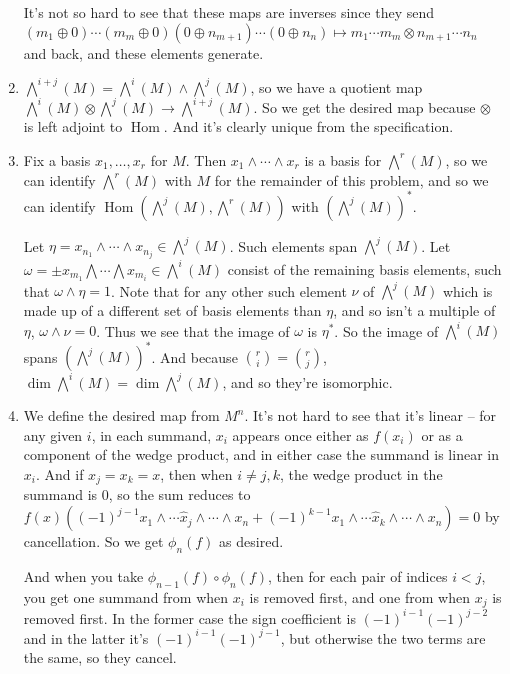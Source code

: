 \documentclass{article}
\DeclareMathOperator\Hom{Hom}
\begin{document}
\begin{enumerate}
     It's not so hard to see that these maps are inverses since they send $(m_1
     \oplus 0)\dotsm(m_m \oplus 0)(0 \oplus n_{m+1})\dotsm(0 \oplus n_n) \mapsto
     m_1\dotsm m_m \otimes n_{m+1} \dotsm n_n$ and back, and these elements
     generate.

  \item $\bigwedge^{i+j}(M) = \bigwedge^i(M) \wedge \bigwedge^j(M)$, so we have
     a quotient map $\bigwedge^i(M) \otimes \bigwedge^j(M) \to
     \bigwedge^{i+j}(M)$. So we get the desired map because $\otimes$ is left
     adjoint to $\Hom$. And it's clearly unique from the specification.

  \item Fix a basis $x_1,\dotsc,x_r$ for $M$. Then $x_1 \wedge \dotsb \wedge
     x_r$ is a basis for $\bigwedge^r(M)$, so we can identify $\bigwedge^r(M)$
     with $M$ for the remainder of this problem, and so we can identify
     $\Hom(\bigwedge^j(M),\bigwedge^r(M))$ with $(\bigwedge^j(M))^*$.

     Let $\eta = x_{n_1} \wedge \dotsb \wedge x_{n_j} \in \bigwedge^j(M)$. Such
     elements span $\bigwedge^j(M)$. Let $\omega = \pm x_{m_1} \bigwedge \dotsb
     \bigwedge x_{m_i} \in \bigwedge^i(M)$ consist of the remaining basis
     elements, such that $\omega \wedge \eta = 1$. Note that for any other such
     element $\nu$ of $\bigwedge^j(M)$ which is made up of a different set of
     basis elements than $\eta$, and so isn't a multiple of $\eta$,  $\omega
     \wedge \nu = 0$. Thus we see that the image of $\omega$ is $\eta^*$. So the
     image of $\bigwedge^i(M)$ spans $(\bigwedge^j(M))^*$. And because
     $\binom{r}{i} = \binom{r}{j}$, $\dim\bigwedge^i(M) = \dim\bigwedge^j(M)$,
     and so they're isomorphic.

  \item We define the desired map from $M^n$. It's not hard to see that it's
     linear -- for any given $i$, in each summand, $x_i$ appears once either as
     $f(x_i)$ or as a component of the wedge product, and in either case the
     summand is linear in $x_i$. And if $x_j = x_k = x$, then when $i \neq j,k$,
     the wedge product in the summand is 0, so the sum reduces to
     $f(x)((-1)^{j-1}x_1\wedge\dotsb\hat x_j\wedge\dotsb\wedge x_n +
     (-1)^{k-1}x_1\wedge\dotsb\hat x_k\wedge\dotsb\wedge x_n) = 0$ by
     cancellation. So we get $\phi_n(f)$ as desired.

     And when you take $\phi_{n-1}(f) \circ \phi_n(f)$, then for each pair of
     indices $i<j$, you get one summand from when $x_i$ is removed first, and
     one from when $x_j$ is removed first. In the former case the sign
     coefficient is $(-1)^{i-1}(-1)^{j-2}$ and in the latter it's
     $(-1)^{i-1}(-1)^{j-1}$, but otherwise the two terms are the same, so they
     cancel.


\end{enumerate}
\end{document}
